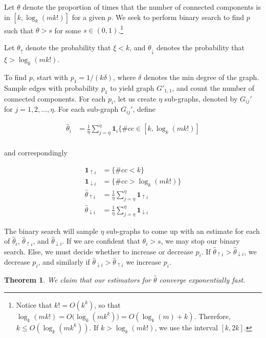 \documentclass{acm_proc_article-sp}
\newtheorem{theorem}{Theorem}
\begin{document}
Let $\theta$ denote the proportion of times that the number of connected components is in $[k, \log_k(mk!)]$ for a given $p$. We seek to perform binary search to find $p$ such that $\theta > s$ for some $s \in (0,1)$.\footnote{Notice that $k! = O(k^k)$, so that
$\log_k(mk!) = O\big(\log_k(mk^k)\big) = O(\log_k(m) + k)$.
Therefore, $k \leq O(\log_k(mk^k))$. If $k > \log_k(mk!)$, we use the interval $[k, 2k]$.}

Let $\theta_{\uparrow}$ denote the probability that $\xi < k$, and $\theta_{\downarrow}$ denotes the probability that 
$\xi > \log_k(mk!)$.

To find $p$, start with $p_1 = 1/(k\delta)$, where $\delta$ denotes the min degree of the graph. Sample edges with probability $p_1$ to yield graph $G'_{1,1}$, and count the number of connected components. For each $p_i$, let us create $\eta$ sub-graphs, denoted by $G_{ij}' $ for 
$j = 1, 2, \ldots, \eta$. For each sub-graph $G_{ij}'$, define

\begin{align*}
\hat{\theta}_i &= \frac{1}{\eta} \sum_{j=\eta}^\eta \boldsymbol{1}_i\{\#cc \in [k, \log_k(mk!)] \\
\end{align*}

and correspondingly

\begin{align*}
\boldsymbol{1}_{\uparrow i} &= \{\# cc < k\} \\
\boldsymbol{1}_{\downarrow i} &= \{\# cc > \log_k(mk!)\} \\
\hat{\theta}_{\uparrow i} &= \frac{1}{\eta} \sum_{j=\eta}^\eta \boldsymbol{1}_{\uparrow i} \\
\hat{\theta}_{\downarrow i} &= \frac{1}{\eta} \sum_{j=\eta}^\eta \boldsymbol{1}_{\downarrow i} 
\end{align*}

The binary search will sample $\eta$ sub-graphs to come up with an estimate for each of $\hat{\theta}_i$, $\hat{\theta}_{\uparrow i}$, and $\hat{\theta}_{\downarrow i}$. If we are confident that $\theta_i > s$, we may stop our binary search. Else, we must decide whether to increase or decrease $p_i$. If 
$\hat{\theta}_{\uparrow i} > \hat{\theta}_{\downarrow i}$, we decrease $p_i$, and similarly if 
$\hat{\theta}_{\downarrow i} > \hat{\theta}_{\uparrow i}$ we increase $p_i$.

\begin{theorem}
We claim that our estimators for $\hat{\theta}$ converge exponentially fast.
\end{theorem}
\end{document}
